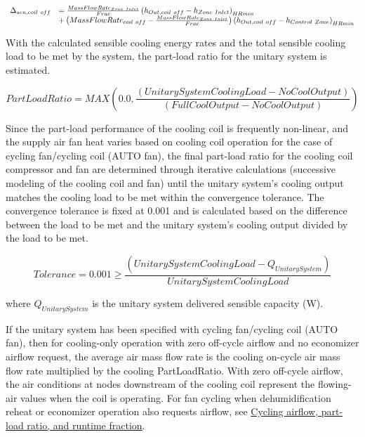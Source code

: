\begin{equation}
  \begin{array}{rl}
    \Delta_{sen,coil~off} &= \frac{MassFlowRate_{Zone~Inlet}}{Frac} \left(h_{Out,coil~off} - h_{Zone~Inlet}\right)_{HRmin} \\
                           &+ \left(MassFlowRate_{coil~off} - \frac{MassFlowRate_{Zone~Inlet}}{Frac}\right) \left( h_{Out,coil~off} - h_{Control~Zone}\right)_{HRmin}
  \end{array}
\end{equation}

With the calculated sensible cooling energy rates and the total sensible cooling load to be met by the system, the part-load ratio for the unitary system is estimated.

\begin{equation}
PartLoadRatio = MAX\left( {0.0,\frac{{\left( {UnitarySystemCoolingLoad - NoCoolOutput} \right)}}{{\left( {FullCoolOutput - NoCoolOutput} \right)}}} \right)
\end{equation}

Since the part-load performance of the cooling coil is frequently non-linear, and the supply air fan heat varies based on cooling coil operation for the case of cycling fan/cycling coil (AUTO fan), the final part-load ratio for the cooling coil compressor and fan are determined through iterative calculations (successive modeling of the cooling coil and fan) until the unitary system's cooling output matches the cooling load to be met within the convergence tolerance. The convergence tolerance is fixed at 0.001 and is calculated based on the difference between the load to be met and the unitary system's cooling output divided by the load to be met.

\begin{equation}
Tolerance = 0.001 \ge \frac{{\left( {UnitarySystemCoolingLoad - {Q_{UnitarySystem}}} \right)}}{{UnitarySystemCoolingLoad}}
\end{equation}

where \({Q_{UnitarySystem}}\) is the unitary system delivered sensible capacity (W).

If the unitary system has been specified with cycling fan/cycling coil (AUTO fan), then for cooling-only operation with zero off-cycle airflow and no economizer airflow request, the average air mass flow rate is the cooling on-cycle air mass flow rate multiplied by the cooling PartLoadRatio. With zero off-cycle airflow, the air conditions at nodes downstream of the cooling coil represent the flowing-air values when the coil is operating. For fan cycling when dehumidification reheat or economizer operation also requests airflow, see \hyperref[unitary-system-cycling-airflow]{Cycling airflow, part-load ratio, and runtime fraction}.

